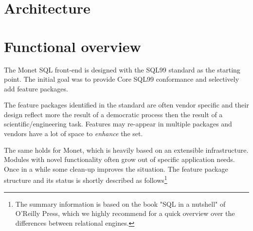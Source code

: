 \documentclass[10pt,twocolumn,fleqn]{article}
\begin{document}
\section{Architecture}
\label{Architecture}

\section{Functional overview}
\label{Functionality}
The Monet SQL front-end is designed with the SQL99 standard as the starting
point. The initial goal was to provide Core SQL99 conformance and
selectively add feature packages.


The feature packages identified in the standard are often vendor specific
and their design reflect more the result of a democratic process then
the result of a scientific/engineering task.
Features may re-appear in multiple packages and vendors have a lot of
space to {\em enhance} the set.

The same holds for Monet, which is heavily based on an extensible 
infrastructure. Modules with novel functionality often grow out of
specific application needs. Once in a while some clean-up improves
the situation.
The feature package structure and its status is shortly described as follows\footnote{The summary information is based on the book "SQL in a nutshell" of
O'Reilly Press, which we highly recommend for a quick overview over the
differences between relational engines.}
\end{document}
